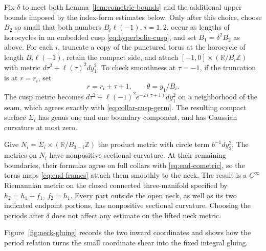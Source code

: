 Fix $\delta$ to meet both Lemma~\ref{lem:cometric-bounds} and the
additional upper bounds imposed by the index-form estimates below.
Only after this choice, choose $B_2$ so small that both numbers
$B_i\ell(-1)$, $i=1,2$, occur as lengths of horocycles in an embedded
cusp \eqref{eq:hyperbolic-cusp}, and set $B_1=\delta^2B_2$ as above.
For each $i$, truncate a copy of the punctured torus at the horocycle
of length $B_i\ell(-1)$, retain the compact side, and attach
$[-1,0]\times(\mathbb R/B_i\mathbb Z)$ with metric
$d\tau^2+\ell(\tau)^2dy_1^2$.
To check smoothness at $\tau=-1$, if the truncation is at $r=r_i$,
set
\[
 r=r_i+\tau+1,\qquad \theta=y_1/B_i.
\]
The cusp metric becomes
$d\tau^2+\ell(-1)^2e^{-2(\tau+1)}dy_1^2$ on a neighborhood of
the seam, which agrees exactly with \eqref{eq:collar-cusp-germ}.
The resulting compact surface $\Sigma_i$ has genus one and one boundary
component, and has Gaussian curvature at most zero.

Give
$N_i=\Sigma_i\times(\mathbb R/B_{3-i}\mathbb Z)$ the product metric
with circle term $b^{-1}dy_2^2$.  The metrics on $N_i$ have nonpositive
sectional curvature.  At their remaining boundaries, their formulas
agree on full collars with \eqref{eq:end-cometric}, so the torus maps
\eqref{eq:end-frames} attach them smoothly to the neck.  The result is
a $C^\infty$ Riemannian metric on the closed connected three-manifold
specified by $h_2=h_1+f_1$, $f_2=h_1$.
Every part outside the open neck, as well as its two indicated endpoint
portions, has nonpositive sectional curvature.  Choosing the periods
after $\delta$ does not affect any estimate on the lifted neck metric.

Figure~\ref{fig:neck-gluing} records the two inward coordinates and
shows how the period relation turns the small coordinate shear into
the fixed integral gluing.

